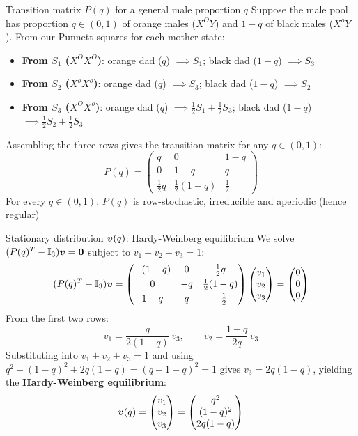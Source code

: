 \documentclass[aspectratio=169]{beamer}\usepackage[]{graphicx}\usepackage[]{xcolor}
\begin{document}
\begin{frame}{Transition matrix $P(q)$ for a general male proportion $q$}
Suppose the male pool has proportion $q \in (0, 1)$ of orange males ($X^O Y$) and $1 - q$ of black males ($X^o Y$). From our Punnett squares for each mother state:
\begin{itemize}
\item \textbf{From $S_1$ ($X^O X^O$)}: orange dad ($q$) $\implies S_1$; black dad ($1-q$) $\implies S_3$
\item \textbf{From $S_2$ ($X^o X^o$)}: orange dad ($q$) $\implies S_3$; black dad ($1-q$) $\implies S_2$
\item \textbf{From $S_3$ ($X^O X^o$)}: orange dad ($q$) $\implies \tfrac{1}{2}S_1 + \tfrac{1}{2}S_3$; black dad ($1-q$) $\implies \tfrac{1}{2}S_2 + \tfrac{1}{2}S_3$
\end{itemize}
\vfill
Assembling the three rows gives the transition matrix for any $q \in (0, 1)$:
\[
P(q) = \begin{pmatrix}
q & 0 & 1-q \\[3pt]
0 & 1-q & q \\[3pt]
\tfrac{1}{2}q & \tfrac{1}{2}(1-q) & \tfrac{1}{2}
\end{pmatrix}
\]
For every $q \in (0, 1)$, $P(q)$ is row-stochastic, irreducible and aperiodic (hence regular)
\end{frame}

\begin{frame}{Stationary distribution $\bm{v}(q)$: Hardy-Weinberg equilibrium}
We solve $(P(q)^T - \II_3)\bv = \b0$ subject to $v_1 + v_2 + v_3 = 1$:
\[
(P(q)^T - \mathbb{I}_3)\bm{v} = \begin{pmatrix}
-(1-q) & 0 & \tfrac{1}{2}q \\[3pt]
0 & -q & \tfrac{1}{2}(1-q) \\[3pt]
1-q & q & -\tfrac{1}{2}
\end{pmatrix}
\begin{pmatrix} v_1 \\ v_2 \\ v_3 \end{pmatrix}
= \begin{pmatrix} 0 \\ 0 \\ 0 \end{pmatrix}
\]
From the first two rows:
\[
v_1 = \frac{q}{2(1-q)}\,v_3, \qquad v_2 = \frac{1-q}{2q}\,v_3
\]
Substituting into $v_1 + v_2 + v_3 = 1$ and using $q^2 + (1-q)^2 + 2q(1-q) = (q + 1 - q)^2 = 1$ gives $v_3 = 2q(1-q)$, yielding the \textbf{Hardy-Weinberg equilibrium}:
\[
\bm{v}(q) = \begin{pmatrix} v_1 \\ v_2 \\ v_3 \end{pmatrix} = \begin{pmatrix} q^2 \\ (1-q)^2 \\ 2q(1-q) \end{pmatrix}
\]
\end{frame}
\end{document}
